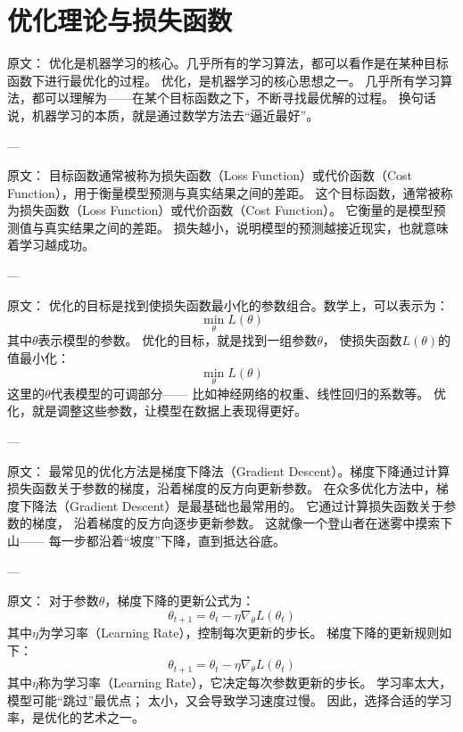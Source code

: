 \section{优化理论与损失函数}

原文：
优化是机器学习的核心。几乎所有的学习算法，都可以看作是在某种目标函数下进行最优化的过程。
优化，是机器学习的核心思想之一。  
几乎所有学习算法，都可以理解为——在某个目标函数之下，不断寻找最优解的过程。  
换句话说，机器学习的本质，就是通过数学方法去“逼近最好”。

---

原文：
目标函数通常被称为损失函数（Loss Function）或代价函数（Cost Function），用于衡量模型预测与真实结果之间的差距。
这个目标函数，通常被称为损失函数（Loss Function）或代价函数（Cost Function）。  
它衡量的是模型预测值与真实结果之间的差距。  
损失越小，说明模型的预测越接近现实，也就意味着学习越成功。

---

原文：
优化的目标是找到使损失函数最小化的参数组合。数学上，可以表示为：
$$
\min_{\theta} L(\theta)
$$
其中$\theta$表示模型的参数。
优化的目标，就是找到一组参数$\theta$，  
使损失函数$L(\theta)$的值最小化：
$$
\min_{\theta} L(\theta)
$$  
这里的$\theta$代表模型的可调部分——  
比如神经网络的权重、线性回归的系数等。  
优化，就是调整这些参数，让模型在数据上表现得更好。

---

原文：
最常见的优化方法是梯度下降法（Gradient Descent）。梯度下降通过计算损失函数关于参数的梯度，沿着梯度的反方向更新参数。
在众多优化方法中，梯度下降法（Gradient Descent）是最基础也最常用的。  
它通过计算损失函数关于参数的梯度，  
沿着梯度的反方向逐步更新参数。  
这就像一个登山者在迷雾中摸索下山——  
每一步都沿着“坡度”下降，直到抵达谷底。

---

原文：
对于参数$\theta$，梯度下降的更新公式为：
$$
\theta_{t+1} = \theta_t - \eta \nabla_\theta L(\theta_t)
$$
其中$\eta$为学习率（Learning Rate），控制每次更新的步长。
梯度下降的更新规则如下：
$$
\theta_{t+1} = \theta_t - \eta \nabla_\theta L(\theta_t)
$$  
其中$\eta$称为学习率（Learning Rate），它决定每次参数更新的步长。  
学习率太大，模型可能“跳过”最优点；  
太小，又会导致学习速度过慢。  
因此，选择合适的学习率，是优化的艺术之一。

